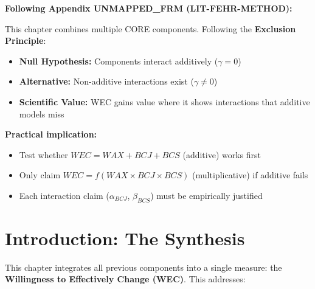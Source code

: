 \begin{tcolorbox}[colback=red!5!white, colframe=red!75!black,
    title=\textbf{Methodological Note: The Exclusion Principle (Appendix UNMAPPED_FRM)}]
\textbf{Following Appendix UNMAPPED_FRM (LIT-FEHR-METHOD):}

This chapter combines multiple CORE components. Following the \textbf{Exclusion Principle}:
\begin{itemize}[nosep]
    \item \textbf{Null Hypothesis:} Components interact additively ($\gamma = 0$)
    \item \textbf{Alternative:} Non-additive interactions exist ($\gamma \neq 0$)
    \item \textbf{Scientific Value:} WEC gains value where it shows interactions that additive models miss
\end{itemize}

\textbf{Practical implication:}
\begin{itemize}[nosep]
    \item Test whether $WEC = WAX + BCJ + BCS$ (additive) works first
    \item Only claim $WEC = f(WAX \times BCJ \times BCS)$ (multiplicative) if additive fails
    \item Each interaction claim ($\alpha_{BCJ}$, $\beta_{BCS}$) must be empirically justified
\end{itemize}
\end{tcolorbox}

\section{Introduction: The Synthesis}

This chapter integrates all previous components into a single measure:
the \textbf{Willingness to Effectively Change (WEC)}. This addresses:

\begin{center}
\end{center}

